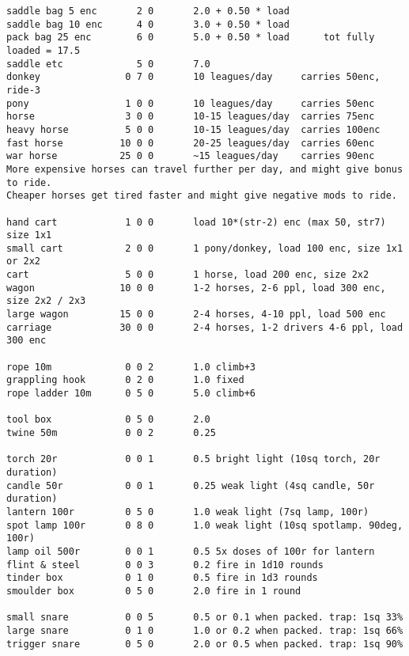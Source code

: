 \begin{verbatim}
saddle bag 5 enc       2 0       2.0 + 0.50 * load
saddle bag 10 enc      4 0       3.0 + 0.50 * load
pack bag 25 enc        6 0       5.0 + 0.50 * load      tot fully loaded = 17.5
saddle etc             5 0       7.0
donkey               0 7 0       10 leagues/day     carries 50enc, ride-3
pony                 1 0 0       10 leagues/day     carries 50enc
horse                3 0 0       10-15 leagues/day  carries 75enc
heavy horse          5 0 0       10-15 leagues/day  carries 100enc
fast horse          10 0 0       20-25 leagues/day  carries 60enc
war horse           25 0 0       ~15 leagues/day    carries 90enc
More expensive horses can travel further per day, and might give bonus to ride.
Cheaper horses get tired faster and might give negative mods to ride.

hand cart            1 0 0       load 10*(str-2) enc (max 50, str7) size 1x1
small cart           2 0 0       1 pony/donkey, load 100 enc, size 1x1 or 2x2
cart                 5 0 0       1 horse, load 200 enc, size 2x2
wagon               10 0 0       1-2 horses, 2-6 ppl, load 300 enc, size 2x2 / 2x3
large wagon         15 0 0       2-4 horses, 4-10 ppl, load 500 enc
carriage            30 0 0       2-4 horses, 1-2 drivers 4-6 ppl, load 300 enc

rope 10m             0 0 2       1.0 climb+3
grappling hook       0 2 0       1.0 fixed
rope ladder 10m      0 5 0       5.0 climb+6

tool box             0 5 0       2.0
twine 50m            0 0 2       0.25

torch 20r            0 0 1       0.5 bright light (10sq torch, 20r duration)
candle 50r           0 0 1       0.25 weak light (4sq candle, 50r duration)
lantern 100r         0 5 0       1.0 weak light (7sq lamp, 100r)
spot lamp 100r       0 8 0       1.0 weak light (10sq spotlamp. 90deg, 100r)
lamp oil 500r        0 0 1       0.5 5x doses of 100r for lantern
flint & steel        0 0 3       0.2 fire in 1d10 rounds
tinder box           0 1 0       0.5 fire in 1d3 rounds
smoulder box         0 5 0       2.0 fire in 1 round

small snare          0 0 5       0.5 or 0.1 when packed. trap: 1sq 33%
large snare          0 1 0       1.0 or 0.2 when packed. trap: 1sq 66%
trigger snare        0 5 0       2.0 or 0.5 when packed. trap: 1sq 90%

\end{verbatim} %
\normalsize





